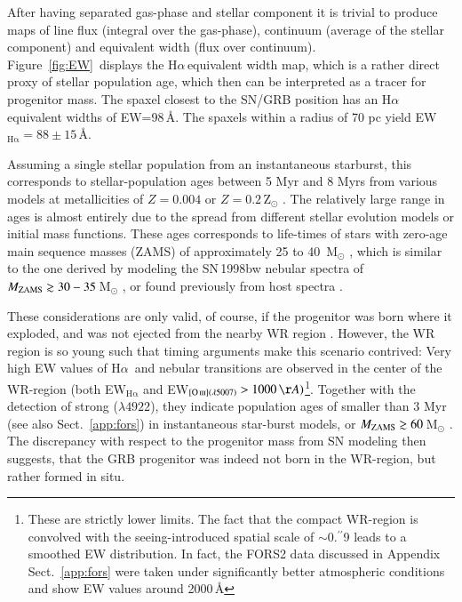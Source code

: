 \documentclass[traditabstract]{aa}
\newcommand{\farc}{\hbox{$.\!\!^{\prime\prime}$}}
\newcommand{\ha}{H$\alpha$}
\newcommand{\hei}{\ion{He}{i}}
\newcommand{\oiii}{[\ion{O}{iii}]}
\begin{document}
After having separated gas-phase and stellar component it is trivial to produce maps of line flux (integral over the gas-phase), continuum (average of the stellar component) and equivalent width (flux over continuum). Figure~\ref{fig:EW}~displays the \ha\,equivalent width map, which is a rather direct proxy of stellar population age, which then can be interpreted as a tracer for progenitor mass. %
The spaxel closest to the SN/GRB position has an \ha\,equivalent widths of EW=98\,\AA. The spaxels within a radius of 70 pc yield EW$_{\mathrm{H\alpha}}=88\pm15$\,\AA. 

Assuming a single stellar population from an instantaneous starburst, this corresponds to stellar-population ages between 5 Myr and 8 Myrs from various models at metallicities of $Z=0.004$ or $Z=0.2$\,Z$_{\odot}$ \citep[see e.g.][and references therein]{2013ApJ...779..170L, 2016arXiv160703446K}. The relatively large range in ages is almost entirely due to the spread from different stellar evolution models or initial mass functions. These ages corresponds to life-times of stars with zero-age main sequence masses (ZAMS) of approximately 25 to 40~M$_{\odot}$ \citep{1994A&AS..105...29F, 2005A&A...429..581M}, which is similar to the one derived by modeling the SN\,1998bw nebular spectra of $M_{\rm{ZAMS}} \gtrsim 30-35$\,M$_{\odot}$ \citep{2001ApJ...559.1047M, 2006ApJ...640..854M},  or found previously from host spectra \citep{2005NewA...11..103S}.

These considerations are only valid, of course, if the progenitor was born where it exploded, and was not ejected from the nearby WR region \citep{2006A&A...454..103H}. However, the WR region is so young such that timing arguments make this scenario contrived: Very high EW values of \ha~and nebular transitions are observed in the center of the WR-region (both EW$_{\mathrm{H\alpha}}$ and EW$_{\oiii(\lambda5007)}>1000\,\AA)$\footnote{These are strictly lower limits. The fact that the compact WR-region is convolved with the seeing-introduced spatial scale of $\sim$0\farc{9} leads to a smoothed EW distribution. In fact, the FORS2 data discussed in Appendix Sect.~\ref{app:fors} were taken under significantly better atmospheric conditions and show EW values around 2000\,\AA}. Together with the detection of strong \hei($\lambda4922$), they indicate population ages of smaller than 3 Myr (see also Sect.~\ref{app:fors}) in instantaneous star-burst models, or $M_{\rm{ZAMS}} \gtrsim 60$\,M$_{\odot}$ \citep[see e.g.][and references therein]{2015MNRAS.451L..65T}. The discrepancy with respect to the progenitor mass from SN modeling then suggests, that the GRB progenitor was indeed not born in the WR-region, but rather formed in situ. 
\end{document}
